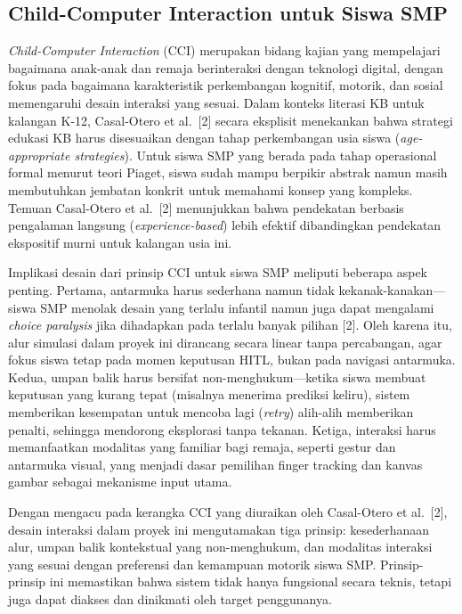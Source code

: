 \documentclass[10pt,twoside,openright]{report}
\begin{document}
\subsection{Child-Computer Interaction untuk Siswa SMP}
\label{subsec:cci-smp}

\textit{Child-Computer Interaction} (CCI) merupakan bidang kajian yang mempelajari bagaimana anak-anak dan remaja berinteraksi dengan teknologi digital, dengan fokus pada bagaimana karakteristik perkembangan kognitif, motorik, dan sosial memengaruhi desain interaksi yang sesuai. Dalam konteks literasi KB untuk kalangan K-12, Casal-Otero et al.\ [2] secara eksplisit menekankan bahwa strategi edukasi KB harus disesuaikan dengan tahap perkembangan usia siswa (\textit{age-appropriate strategies}). Untuk siswa SMP yang berada pada tahap operasional formal menurut teori Piaget, siswa sudah mampu berpikir abstrak namun masih membutuhkan jembatan konkrit untuk memahami konsep yang kompleks. Temuan Casal-Otero et al.\ [2] menunjukkan bahwa pendekatan berbasis pengalaman langsung (\textit{experience-based}) lebih efektif dibandingkan pendekatan ekspositif murni untuk kalangan usia ini.

Implikasi desain dari prinsip CCI untuk siswa SMP meliputi beberapa aspek penting. Pertama, antarmuka harus sederhana namun tidak kekanak-kanakan---siswa SMP menolak desain yang terlalu infantil namun juga dapat mengalami \textit{choice paralysis} jika dihadapkan pada terlalu banyak pilihan [2]. Oleh karena itu, alur simulasi dalam proyek ini dirancang secara linear tanpa percabangan, agar fokus siswa tetap pada momen keputusan HITL, bukan pada navigasi antarmuka. Kedua, umpan balik harus bersifat non-menghukum---ketika siswa membuat keputusan yang kurang tepat (misalnya menerima prediksi keliru), sistem memberikan kesempatan untuk mencoba lagi (\textit{retry}) alih-alih memberikan penalti, sehingga mendorong eksplorasi tanpa tekanan. Ketiga, interaksi harus memanfaatkan modalitas yang familiar bagi remaja, seperti gestur dan antarmuka visual, yang menjadi dasar pemilihan finger tracking dan kanvas gambar sebagai mekanisme input utama.

Dengan mengacu pada kerangka CCI yang diuraikan oleh Casal-Otero et al.\ [2], desain interaksi dalam proyek ini mengutamakan tiga prinsip: kesederhanaan alur, umpan balik kontekstual yang non-menghukum, dan modalitas interaksi yang sesuai dengan preferensi dan kemampuan motorik siswa SMP. Prinsip-prinsip ini memastikan bahwa sistem tidak hanya fungsional secara teknis, tetapi juga dapat diakses dan dinikmati oleh target penggunanya.
\end{document}
